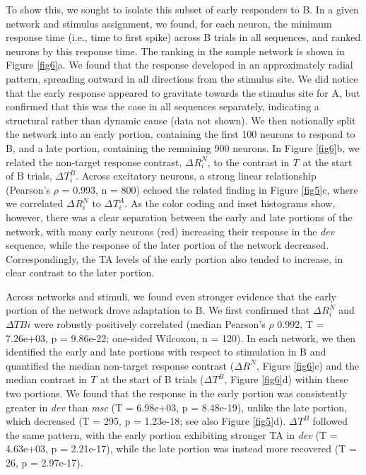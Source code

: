 \documentclass[pdflatex,referee,iicol,sn-basic]{sn-jnl}
\newcommand{\dev}{\textit{dev}}
\newcommand{\msc}{\textit{msc}}
\renewcommand{\R}[3][]{{}^{#1}_{}\!R^{#2}_{#3}}
\renewcommand{\T}[3][]{{}^{#1}_{}T^{#2}_{#3}}
\theoremstyle{thmstyleone}%
\theoremstyle{thmstyletwo}%
\theoremstyle{thmstylethree}%
\begin{document}
To show this, we sought to isolate this subset of early responders to B. In a given network and stimulus assignment, we found, for each neuron, the minimum response time (i.e., time to first spike) across B trials in all sequences, and ranked neurons by this response time. The ranking in the sample network is shown in Figure \ref{fig6}a. We found that the response developed in an approximately radial pattern, spreading outward in all directions from the stimulus site. We did notice that the early response appeared to gravitate towards the stimulus site for A, but confirmed that this was the case in all sequences separately, indicating a structural rather than dynamic cause (data not shown). We then notionally split the network into an early portion, containing the first 100 neurons to respond to B, and a late portion, containing the remaining 900 neurons. In Figure \ref{fig6}b, we related the non-target response contrast, $\Delta \R{N}{i}$, to the contrast in $\T{}{}$ at the start of B trials, $\Delta \T{B}{i}$. Across excitatory neurons, a strong linear relationship (Pearson's $\rho$ = 0.993, n = 800) echoed the related finding in Figure \ref{fig5}c, where we correlated $\Delta \R{N}{i}$ to $\Delta \T{A}{i}$. As the color coding and inset histograms show, however, there was a clear separation between the early and late portions of the network, with many early neurons (red) increasing their response in the \dev{} sequence, while the response of the later portion of the network decreased. Correspondingly, the TA levels of the early portion also tended to increase, in clear contrast to the later portion.

Across networks and stimuli, we found even stronger evidence that the early portion of the network drove adaptation to B. We first confirmed that $\Delta \R{N}{i}$ and $\Delta T{B}{i}$ were robustly positively correlated (median Pearson's $\rho$ 0.992, T = 7.26e+03, p = 9.86e-22; one-sided Wilcoxon, n = 120). In each network, we then identified the early and late portions with respect to stimulation in B and quantified the median non-target response contrast ($\Delta \R{N}{}$, Figure \ref{fig6}c) and the median contrast in $\T{}{}$ at the start of B trials ($\Delta \T{B}{}$, Figure \ref{fig6}d) within these two portions. We found that the response in the early portion was consistently greater in \dev{} than \msc{} (T = 6.98e+03, p = 8.48e-19), unlike the late portion, which decreased (T = 295, p = 1.23e-18; see also Figure \ref{fig5}d). $\Delta \T{B}{}$ followed the same pattern, with the early portion exhibiting stronger TA in \dev{} (T = 4.63e+03, p = 2.21e-17), while the late portion was instead more recovered (T = 26, p = 2.97e-17).
\end{document}

